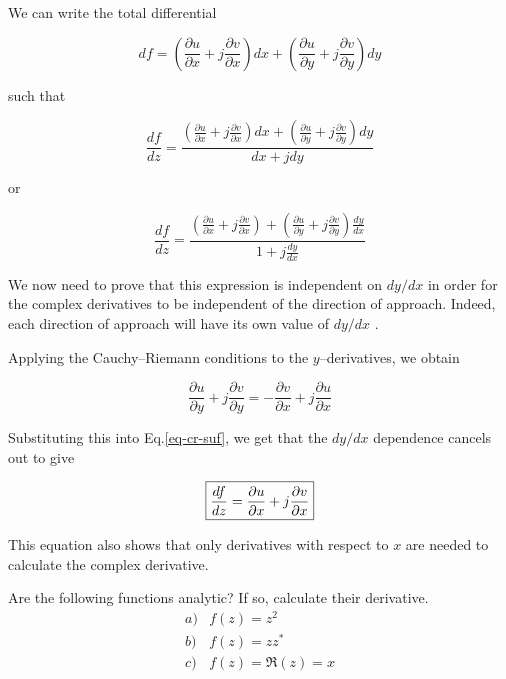 We can write the total differential

\begin{equation}
d f = \left( \frac{\partial u}{\partial x}+j\frac{\partial v}{\partial x}\right)
d x+\left(\frac{\partial u}{\partial y}+j\frac{\partial v}{\partial y}\right) d
y
\end{equation} 

such that

\begin{equation}
\frac{d f}{d z} = \frac{\left(\frac{\partial u}{\partial x}+j\frac{\partial
v}{\partial x}\right) d x+\left(\frac{\partial u}{\partial y}+j\frac{\partial
v}{\partial y}\right) d y}{d x + j d y}
\end{equation} 

or

\begin{equation}
\frac{d f}{d z} = \frac{\left(\frac{\partial u}{\partial x}+j\frac{\partial
v}{\partial x}\right) +\left(\frac{\partial u}{\partial y}+j\frac{\partial
v}{\partial y}\right) \frac{d y}{d x}}{1 + j \frac{d y}{d x}} \label{eq-cr-suf}
\end{equation} 

We now need to prove that this expression is independent on $d y / d x$ in order
for the complex derivatives to be independent of the direction of approach. Indeed, each direction of approach will have its own value of $d y / d x$ .

Applying the Cauchy--Riemann conditions to the $y$--derivatives, we obtain

\begin{equation}
\frac{\partial u}{\partial y}+j\frac{\partial v}{\partial y} = -\frac{\partial
v}{\partial x}+j\frac{\partial u}{\partial x}
\end{equation}

Substituting this into Eq.\ref{eq-cr-suf}, we get that the $d y / d x$
dependence cancels out to give

\begin{equation}
\fbox{$\displaystyle
\frac{d f}{d z} = \frac{\partial u}{\partial x}+j\frac{\partial v}{\partial x}
$}
\end{equation} 

This equation also shows that only derivatives with respect to $x$ are needed to
calculate the complex derivative.

\begin{sidebar}
\begin{ex}
Are the following functions analytic? If so, calculate their derivative.
$$\begin{array}{lcll}a) & f(z)=z^2 \\b) & f(z)=z z^* \\c) & f(z)= \Re(z)=x \end{array}$$
\end{ex}
\end{sidebar}

